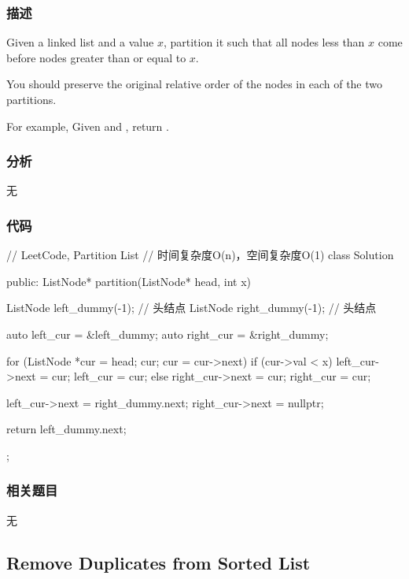 \subsubsection{描述}
Given a linked list and a value $x$, partition it such that all nodes less than $x$ come before nodes greater than or equal to $x$.

You should preserve the original relative order of the nodes in each of the two partitions.

For example,
Given  and , return .


\subsubsection{分析}
无


\subsubsection{代码}
\begin{Code}
// LeetCode, Partition List
// 时间复杂度O(n)，空间复杂度O(1)
class Solution {
public:
    ListNode* partition(ListNode* head, int x) {
        ListNode left_dummy(-1); // 头结点
        ListNode right_dummy(-1); // 头结点

        auto left_cur = &left_dummy;
        auto right_cur = &right_dummy;

        for (ListNode *cur = head; cur; cur = cur->next) {
            if (cur->val < x) {
                left_cur->next = cur;
                left_cur = cur;
            } else {
                right_cur->next = cur;
                right_cur = cur;
            }
        }

        left_cur->next = right_dummy.next;
        right_cur->next = nullptr;

        return left_dummy.next;
    }
};
\end{Code}


\subsubsection{相关题目}

\begindot
\item 无
\myenddot


\subsection{Remove Duplicates from Sorted List}
\label{sec:remove-duplicates-from-sorted-list}


